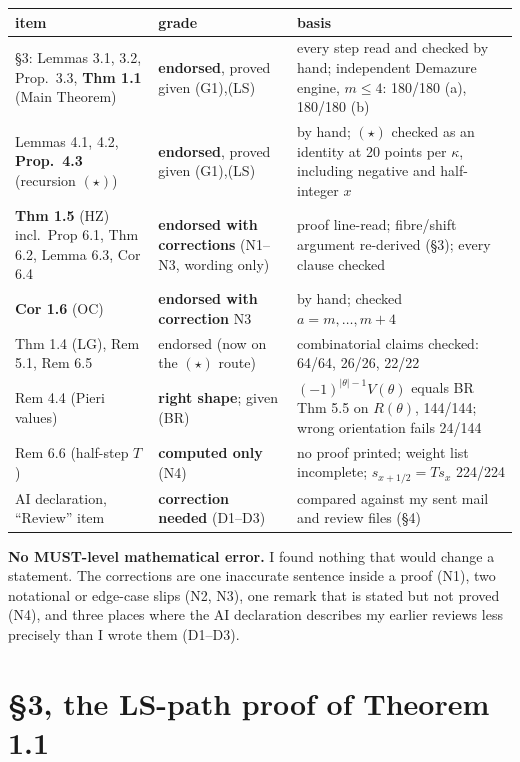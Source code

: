 \documentclass[11pt]{article}
\begin{document}
\begin{center}\small
\begin{tabular}{@{}p{5.2cm}p{4.3cm}p{6.3cm}@{}}
\toprule
item & grade & basis\\\midrule
\S3: Lemmas 3.1, 3.2, Prop.~3.3, \textbf{Thm 1.1} (Main Theorem) & \textbf{endorsed}, proved given (G1),(LS) & every step read and checked by hand; independent Demazure engine, $m\le4$: 180/180 (a), 180/180 (b)\\
Lemmas 4.1, 4.2, \textbf{Prop.~4.3} (recursion $(\star)$) & \textbf{endorsed}, proved given (G1),(LS) & by hand; $(\star)$ checked as an identity at 20 points per $\kappa$, including negative and half-integer $x$\\
\textbf{Thm 1.5} (HZ) incl.\ Prop 6.1, Thm 6.2, Lemma 6.3, Cor 6.4 & \textbf{endorsed with corrections} (N1--N3, wording only) & proof line-read; fibre/shift argument re-derived (\S3); every clause checked\\
\textbf{Cor 1.6} (OC) & \textbf{endorsed with correction} N3 & by hand; checked $a=m,\dots,m+4$\\
Thm 1.4 (LG), Rem 5.1, Rem 6.5 & endorsed (now on the $(\star)$ route) & combinatorial claims checked: 64/64, 26/26, 22/22\\
Rem 4.4 (Pieri values) & \textbf{right shape}; given (BR) & $(-1)^{|\theta|-1}V(\theta)$ equals BR Thm 5.5 on $R(\theta)$, 144/144; wrong orientation fails 24/144\\
Rem 6.6 (half-step $T$) & \textbf{computed only} (N4) & no proof printed; weight list incomplete; $s_{x+1/2}=Ts_x$ 224/224\\
AI declaration, ``Review'' item & \textbf{correction needed} (D1--D3) & compared against my sent mail and review files (\S4)\\
\bottomrule
\end{tabular}
\end{center}

\noindent\textbf{No MUST-level mathematical error.} I found nothing that would change a statement.
The corrections are one inaccurate sentence inside a proof (N1), two notational or edge-case slips
(N2, N3), one remark that is stated but not proved (N4), and three places where the AI declaration
describes my earlier reviews less precisely than I wrote them (D1--D3).

\section{\S3, the LS-path proof of Theorem 1.1}
\end{document}
